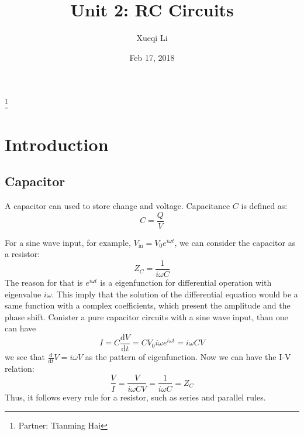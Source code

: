 \documentclass[aps,prl,reprint]{revtex4-1}
\newcommand{\de}{\mathrm{d}}
\begin{document}
\title{Unit 2: RC Circuits}
\author{Xueqi Li}
\thanks{Partner: Tianming Hai}
\noaffiliation
\date{Feb 17, 2018}



\maketitle

\section{Introduction}  
    \subsection{Capacitor}
    A capacitor can used to store change and voltage. Capacitance $C$ is defined as:
    \[
        C = \frac{Q}{V}
    \]
    
    For a sine wave input, for example, $V_\text{in} = V_0 e^{i\omega t}$, we can consider the capacitor as a resistor:
    \[
        Z_C = \frac{1}{i\omega C}
    \]
    The reason for that is $e^{i\omega t}$ is a eigenfunction for differential operation with eigenvalue $i \omega$. This imply that the solution of the differential equation would be a same function with a complex coefficients, which present the amplitude and the phase shift. Conister a pure capacitor circuits with a sine wave input, than one can have
    \[
    I = C \frac{\de V}{\de t} = C V_0 i \omega e^{i\omega t} = i \omega C V
    \]
    we see that $\frac{\de }{\de t} V= i \omega V$ as the pattern of eigenfunction. Now we can have the I-V relation:
    \[
    \frac{V}{I} = \frac{V}{i \omega C V} = \frac{1}{i \omega C} = Z_C
    \]
    Thus, it follows every rule for a resistor, such as series and parallel rules.
\end{document}
